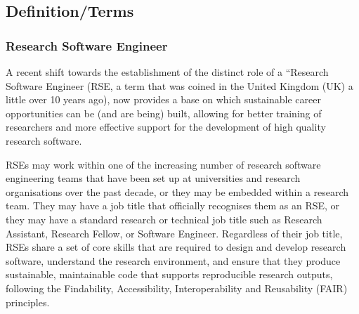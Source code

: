 \documentclass[
        english,biblatex
    ]{lni}
\begin{document}
    \subsection{Definition/Terms}\label{definitionterms}

    \subsubsection{Research Software
    Engineer}\label{research-software-engineer}

    A recent shift towards the establishment of the distinct role of a
    ``Research Software Engineer (RSE, a term that was coined in the
    United Kingdom (UK) a little over 10 years ago), now provides a base
    on which sustainable career opportunities can be (and are being)
    built, allowing for better training of researchers and more
    effective support for the development of high quality research
    software.

    RSEs may work within one of the increasing number of research
    software engineering teams that have been set up at universities and
    research organisations over the past decade, or they may be embedded
    within a research team. They may have a job title that officially
    recognises them as an RSE, or they may have a standard research or
    technical job title such as Research Assistant, Research Fellow, or
    Software Engineer. Regardless of their job title, RSEs share a set
    of core skills that are required to design and develop research
    software, understand the research environment, and ensure that they
    produce sustainable, maintainable code that supports reproducible
    research outputs, following the Findability, Accessibility,
    Interoperability and Reusability (FAIR) principles.
\end{document}
